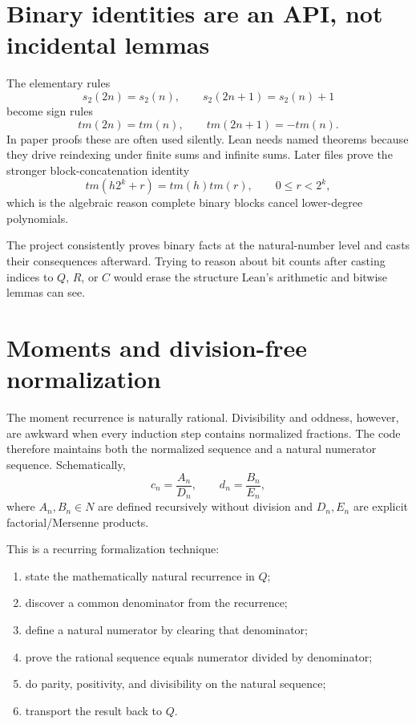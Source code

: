 \documentclass[11pt,a4paper,openany]{book}
\def\TM{tm}
\def\R{R}
\def\Q{Q}
\def\N{N}
\def\C{C}
\newcommand{\R}{\ensuremath{\mathbb{R}}}
\newcommand{\Q}{\ensuremath{\mathbb{Q}}}
\newcommand{\N}{\ensuremath{\mathbb{N}}}
\newcommand{\C}{\ensuremath{\mathbb{C}}}
\newcommand{\TM}{\ensuremath{\operatorname{tm}}}
\begin{document}
\section{Binary identities are an API, not incidental lemmas}
The elementary rules
\[
 s_2(2n)=s_2(n),\qquad s_2(2n+1)=s_2(n)+1
\]
become sign rules
\[
 \TM(2n)=\TM(n),\qquad \TM(2n+1)=-\TM(n).
\]
In paper proofs these are often used silently.  Lean needs named theorems
because they drive reindexing under finite sums and infinite sums.  Later files
prove the stronger block-concatenation identity
\[
 \TM(h2^k+r)=\TM(h)\TM(r),\qquad 0\le r<2^k,
\]
which is the algebraic reason complete binary blocks cancel lower-degree
polynomials.

\begin{engineering}
The project consistently proves binary facts at the natural-number level and
casts their consequences afterward.  Trying to reason about bit counts after
casting indices to $\Q$, $\R$, or $\C$ would erase the structure Lean's
arithmetic and bitwise lemmas can see.
\end{engineering}

\section{Moments and division-free normalization}
The moment recurrence is naturally rational.  Divisibility and oddness,
however, are awkward when every induction step contains normalized fractions.
The code therefore maintains both the normalized sequence and a natural
numerator sequence.  Schematically,
\[
 c_n=\frac{A_n}{D_n},\qquad d_n=\frac{B_n}{E_n},
\]
where $A_n,B_n\in\N$ are defined recursively without division and $D_n,E_n$
are explicit factorial/Mersenne products.

This is a recurring formalization technique:
\begin{enumerate}
  \item state the mathematically natural recurrence in $\Q$;
  \item discover a common denominator from the recurrence;
  \item define a natural numerator by clearing that denominator;
  \item prove the rational sequence equals numerator divided by denominator;
  \item do parity, positivity, and divisibility on the natural sequence;
  \item transport the result back to $\Q$.
\end{enumerate}
\end{document}

